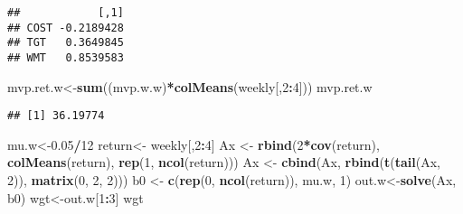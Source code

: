\documentclass[]{article}
\newenvironment{Shaded}{\begin{snugshade}}{\end{snugshade}}
\newcommand{\DataTypeTok}[1]{\textcolor[rgb]{0.13,0.29,0.53}{#1}}
\newcommand{\DecValTok}[1]{\textcolor[rgb]{0.00,0.00,0.81}{#1}}
\newcommand{\FloatTok}[1]{\textcolor[rgb]{0.00,0.00,0.81}{#1}}
\newcommand{\KeywordTok}[1]{\textcolor[rgb]{0.13,0.29,0.53}{\textbf{#1}}}
\newcommand{\NormalTok}[1]{#1}
\newcommand{\OperatorTok}[1]{\textcolor[rgb]{0.81,0.36,0.00}{\textbf{#1}}}
\newcommand{\StringTok}[1]{\textcolor[rgb]{0.31,0.60,0.02}{#1}}
\begin{document}
\begin{Shaded}
\end{Shaded}

\begin{verbatim}
##            [,1]
## COST -0.2189428
## TGT   0.3649845
## WMT   0.8539583
\end{verbatim}

\begin{Shaded}
\begin{Highlighting}[]
\NormalTok{mvp.ret.w<-}\KeywordTok{sum}\NormalTok{((mvp.w.w)}\OperatorTok{*}\KeywordTok{colMeans}\NormalTok{(weekly[,}\DecValTok{2}\OperatorTok{:}\DecValTok{4}\NormalTok{]))}
\NormalTok{mvp.ret.w}
\end{Highlighting}
\end{Shaded}

\begin{verbatim}
## [1] 36.19774
\end{verbatim}

\begin{Shaded}
\begin{Highlighting}[]
\NormalTok{mu.w<-}\FloatTok{0.05}\OperatorTok{/}\DecValTok{12}
\NormalTok{return<-}\StringTok{ }\NormalTok{weekly[,}\DecValTok{2}\OperatorTok{:}\DecValTok{4}\NormalTok{]}
\NormalTok{Ax <-}\StringTok{ }\KeywordTok{rbind}\NormalTok{(}\DecValTok{2}\OperatorTok{*}\KeywordTok{cov}\NormalTok{(return), }\KeywordTok{colMeans}\NormalTok{(return), }\KeywordTok{rep}\NormalTok{(}\DecValTok{1}\NormalTok{, }\KeywordTok{ncol}\NormalTok{(return)))}
\NormalTok{Ax <-}\StringTok{ }\KeywordTok{cbind}\NormalTok{(Ax, }\KeywordTok{rbind}\NormalTok{(}\KeywordTok{t}\NormalTok{(}\KeywordTok{tail}\NormalTok{(Ax, }\DecValTok{2}\NormalTok{)), }\KeywordTok{matrix}\NormalTok{(}\DecValTok{0}\NormalTok{, }\DecValTok{2}\NormalTok{, }\DecValTok{2}\NormalTok{)))}
\NormalTok{b0 <-}\StringTok{ }\KeywordTok{c}\NormalTok{(}\KeywordTok{rep}\NormalTok{(}\DecValTok{0}\NormalTok{, }\KeywordTok{ncol}\NormalTok{(return)), mu.w, }\DecValTok{1}\NormalTok{)}
\NormalTok{out.w<-}\KeywordTok{solve}\NormalTok{(Ax, b0)}
\NormalTok{wgt<-out.w[}\DecValTok{1}\OperatorTok{:}\DecValTok{3}\NormalTok{]}
\NormalTok{wgt}
\end{Highlighting}
\end{Shaded}
\end{document}
